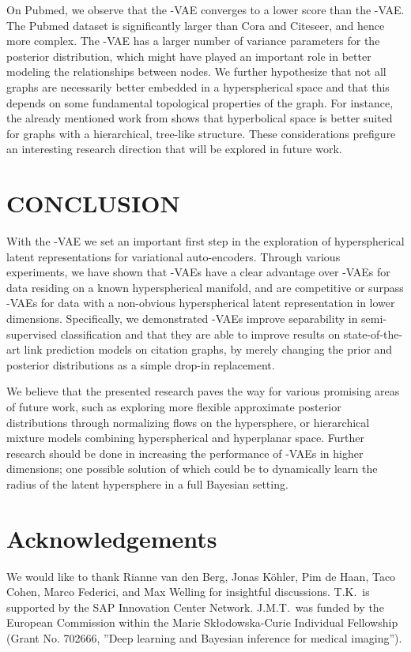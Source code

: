 \documentclass[letterpaper]{article}
\newcommand{\Sv}{}
\newcommand{\Nv}{}
\begin{document}
On Pubmed, we observe that the \Sv-VAE converges to a lower score than the \Nv-VAE. The Pubmed dataset is significantly larger than Cora and Citeseer, and hence more complex. The \Nv-VAE has a larger number of variance parameters for the posterior distribution, which might have played an important role in better modeling the relationships between nodes. We further hypothesize that not all graphs are necessarily better embedded in a hyperspherical space and that this depends on some fundamental topological properties of the graph. For instance, the already mentioned work from \citet{nickel2017poincare} shows that hyperbolical space is better suited for graphs with a hierarchical, tree-like structure. These considerations prefigure an interesting research direction that will be explored in future work. 


\section{CONCLUSION}

With the \Sv-VAE we set an important first step in the exploration of hyperspherical latent representations for variational auto-encoders. Through various experiments, we have shown that \Sv-VAEs have a clear advantage over \Nv-VAEs for data residing on a known hyperspherical manifold, and are competitive or surpass \Nv-VAEs for data with a non-obvious hyperspherical latent representation in lower dimensions. Specifically, we demonstrated \Sv-VAEs improve separability in semi-supervised classification and that they are able to improve results on state-of-the-art link prediction models on citation graphs, by merely changing the prior and posterior distributions as a simple drop-in replacement.

We believe that the presented research paves the way for various promising areas of future work, such as exploring more flexible approximate posterior distributions through normalizing flows on the hypersphere, or hierarchical mixture models combining hyperspherical and hyperplanar space. Further research should be done in increasing the performance of \Sv-VAEs in higher dimensions; one possible solution of which could be to dynamically learn the radius of the latent hypersphere in a full Bayesian setting.

\section*{Acknowledgements}
We would like to thank Rianne van den Berg, Jonas K\"ohler, Pim de Haan, Taco Cohen, Marco Federici, and Max Welling for insightful discussions. T.K.~is supported by the SAP Innovation Center Network. J.M.T.~was funded by the European Commission within the Marie Sk\l odowska-Curie Individual Fellowship (Grant No. 702666, ”Deep learning and Bayesian inference for medical imaging”).
\end{document}
